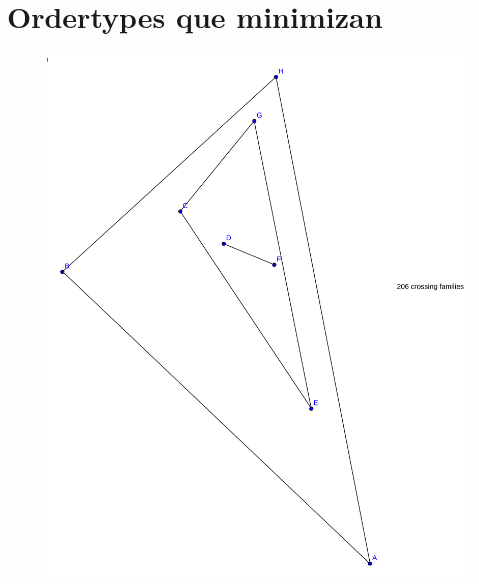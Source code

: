 \documentclass[11pt,epsf,times,letterpaper]{article}
\begin{document}
	\section{Ordertypes que minimizan}
	
	\begin{figure}[!h]
		\includegraphics[scale=.25]{2k2/min8_otype2988.png}

\end{figure}
\end{document}
